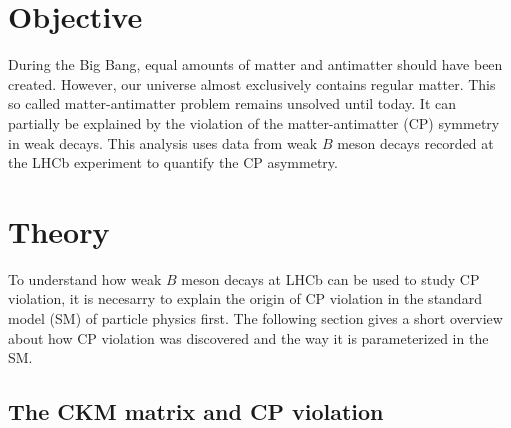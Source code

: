 \section{Objective}

During the Big Bang, equal amounts of matter and antimatter should have been created. However, our universe almost exclusively contains regular matter.
This so called matter-antimatter problem remains unsolved until today. It can partially be explained by the violation of
the matter-antimatter (CP) symmetry in weak decays. This analysis uses data from weak $B$ meson decays recorded at the LHCb experiment to quantify
the CP asymmetry.

\section{Theory}
\label{sec:Theorie}

To understand how weak $B$ meson decays at LHCb can be used to study CP violation, it is necesarry to explain the origin of CP violation in the standard model (SM)
of particle physics first. The following section gives a short overview about how CP violation was discovered and the way it is parameterized in the SM.

\subsection{The CKM matrix and CP violation}

